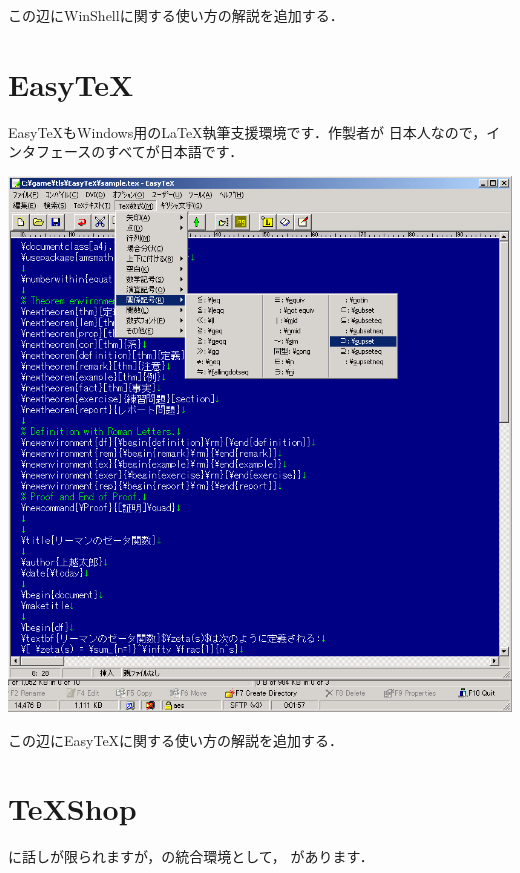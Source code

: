 \begin{append}
 この辺にWinShellに関する使い方の解説を追加する．
\end{append}

\section{Easy\TeX}

Easy\TeX もWindows用の\LaTeX 執筆支援環境です．作製者が
日本人なので，インタフェースのすべてが日本語です．

\begin{center}
 \includegraphics[scale=.4]{images/EasyTeX}
\end{center}

\begin{append}
 この辺にEasy\TeX に関する使い方の解説を追加する． 
\end{append}

\section{TeXShop}

に話しが限られますが，\laTEX の統合環境として，
があります．

